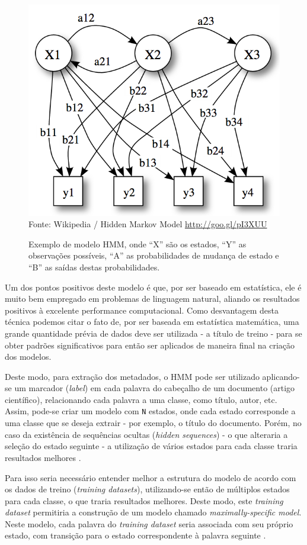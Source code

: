 \begin{figure}[h!]
    \centering
    \caption{Exemplo de modelo HMM, onde ``X'' são os estados, ``Y'' as observações possíveis, ``A'' as probabilidades de mudança de estado e ``B'' as saídas destas probabilidades.}
    \label{fig:hmm-states}
    \includegraphics[width=0.7\linewidth]{./assets/images/hmm-states}
    \center\footnotesize{Fonte: Wikipedia / Hidden Markov Model \url{http://goo.gl/pI3XUU}}
\end{figure}

Um dos pontos positivos deste modelo é que, por ser baseado em estatística, ele é muito bem empregado em problemas de linguagem natural, aliando os resultados positivos à excelente performance computacional. Como desvantagem desta técnica podemos citar o fato de, por ser baseada em estatística matemática, uma grande quantidade prévia de dados deve ser utilizada - a título de treino - para se obter padrões significativos para então ser aplicados de maneira final na criação dos modelos.

Deste modo, para extração dos metadados, o HMM pode ser utilizado aplicando-se um marcador (\textit{label}) em cada palavra do cabeçalho de um documento (artigo científico), relacionando cada palavra a uma classe, como título, autor, etc. Assim, pode-se criar um modelo com \texttt{N} estados, onde cada estado corresponde a uma classe que se deseja extrair - por exemplo, o título do documento. Porém, no caso da existência de sequências ocultas (\textit{hidden sequences}) - o que alteraria a seleção do estado seguinte - a utilização de vários estados para cada classe traria resultados melhores \cite{Seymore-HMM-IE}.


Para isso seria necessário entender melhor a estrutura do modelo de acordo com os dados de treino (\textit{training datasets}), utilizando-se então de múltiplos estados para cada classe, o que traria resultados melhores. Deste modo, este \textit{training dataset} permitiria a construção de um modelo chamado \textit{maximally-specific model}. Neste modelo, cada palavra do \textit{training dataset} seria associada com seu próprio estado, com transição para o estado correspondente à palavra seguinte \cite{Seymore-HMM-IE}.

